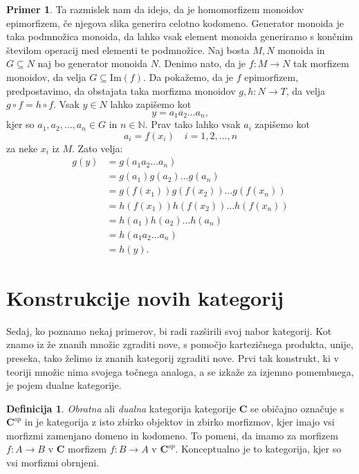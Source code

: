\documentclass[12pt,a4paper]{book}
\theoremstyle{definition}
\newtheorem{definicija}{Definicija}[chapter]
\theoremstyle{plain}
\theoremstyle{definition}
\newtheorem{primer}{Primer}[section]
\theoremstyle{remark}
\newcommand{\cat}[1]{\textbf{#1}}
\begin{document}
\begin{primer}
Ta razmislek nam da idejo, da je homomorfizem monoidov epimorfizem, če njegova slika generira celotno kodomeno. Generator monoida je taka podmnožica monoida, da lahko vsak element monoida generiramo s končnim številom operacij med elementi te podmnožice. Naj bosta $M,N$ monoida in $G \subseteq N$ naj bo generator monoida $N$. Denimo nato, da je $f: M \to N$ tak morfizem monoidov, da velja $G \subseteq \mathrm{Im}(f)$. Da pokažemo, da je $f$ epimorfizem, predpostavimo, da obstajata taka morfizma monoidov $g,h: N \to T$, da velja $g \circ f = h \circ f$. Vsak $y \in N$ lahko zapišemo kot 
$$y = a_1 a_2 \ldots a_n,$$
kjer so $a_1,a_2,\ldots,a_n \in G$ in $n \in \mathbb{N}$. Prav tako lahko  vsak $a_i$ zapišemo kot
$$a_i = f(x_i) \quad i=1,2,\ldots,n$$
za neke $x_i$ iz $M$. Zato velja:
\begin{align*}
g(y) &= g(a_1 a_2 \ldots a_n) \\
&= g(a_1) g(a_2) \ldots g(a_n) \\
&= g(f(x_1)) g(f(x_2)) \ldots g(f(x_n)) \\
&= h(f(x_1)) h(f(x_2)) \ldots h(f(x_n)) \\
&= h(a_1) h(a_2) \ldots h(a_n) \\
&= h(a_1 a_2 \ldots a_n) \\
&= h(y).
\end{align*}

\end{primer}


\section{Konstrukcije novih kategorij}

Sedaj, ko poznamo nekaj primerov, bi radi razširili svoj nabor kategorij. Kot znamo iz že znanih množic zgraditi nove, s pomočjo kartezičnega produkta, unije, preseka, tako želimo iz znanih kategorij zgraditi nove. Prvi tak konstrukt, ki v teoriji množic nima svojega točnega analoga, a se izkaže za izjemno pomembnega, je pojem dualne kategorije.


\begin{definicija}

\emph{Obratna} ali \emph{dualna} kategorija kategorije $\cat{C}$ se običajno označuje s $\cat{C}^{op}$ in je kategorija z isto zbirko objektov in zbirko morfizmov, kjer imajo vsi morfizmi zamenjano domeno in kodomeno. 
To pomeni, da imamo za morfizem $f : A \to B$ v $\cat{C}$ morfizem $f : B \to A$ v $\cat{C}^{op}$. Konceptualno je to kategorija, kjer so vsi morfizmi obrnjeni.
\end{definicija}
\end{document}
